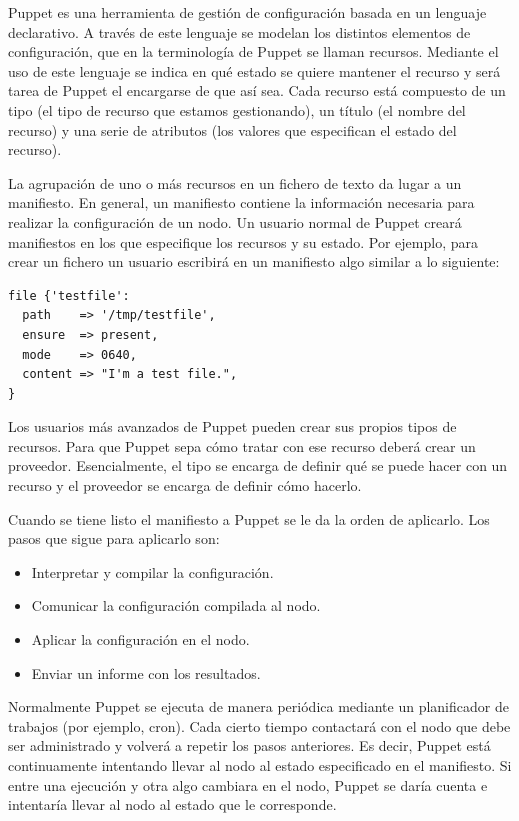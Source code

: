 Puppet \cite{puppetlabs} es una herramienta de gestión de configuración basada en un lenguaje declarativo. A través de este lenguaje se modelan los distintos elementos de configuración, que en la terminología de Puppet se llaman recursos. Mediante el uso de este lenguaje se indica en qué estado se quiere mantener el recurso y será tarea de Puppet el encargarse de que así sea. Cada recurso está compuesto de un tipo (el tipo de recurso que estamos gestionando), un título (el nombre del recurso) y una serie de atributos (los valores que especifican el estado del recurso). 

La agrupación de uno o más recursos en un fichero de texto da lugar a un manifiesto. En general, un manifiesto contiene la información necesaria para realizar la configuración de un nodo. Un usuario normal de Puppet creará manifiestos en los que especifique los recursos y su estado. Por ejemplo, para crear un fichero un usuario escribirá en un manifiesto algo similar a lo siguiente:

\begin{lstlisting}
file {'testfile':
  path    => '/tmp/testfile',
  ensure  => present,
  mode    => 0640,
  content => "I'm a test file.",
}
\end{lstlisting}

Los usuarios más avanzados de Puppet pueden crear sus propios tipos de recursos. Para que Puppet sepa cómo tratar con ese recurso deberá crear un proveedor. Esencialmente, el tipo se encarga de definir qué se puede hacer con un recurso y el proveedor se encarga de definir cómo hacerlo.

Cuando se tiene listo el manifiesto a Puppet se le da la orden de aplicarlo. Los pasos que sigue para aplicarlo son:

\begin{itemize}
\item Interpretar y compilar la configuración.
\item Comunicar la configuración compilada al nodo.
\item Aplicar la configuración en el nodo.
\item Enviar un informe con los resultados.
\end{itemize}


Normalmente Puppet se ejecuta de manera periódica mediante un planificador de trabajos (por ejemplo, cron). Cada cierto tiempo contactará con el nodo que debe ser administrado y volverá a repetir los pasos anteriores. Es decir, Puppet está continuamente intentando llevar al nodo al estado especificado en el manifiesto. Si entre una ejecución y otra algo cambiara en el nodo, Puppet se daría cuenta e intentaría llevar al nodo al estado que le corresponde. \\

